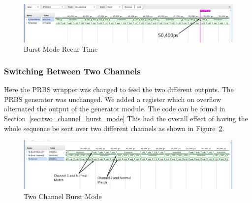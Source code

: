 \begin{figure}[ht]
    \centering
    \hspace*{-3cm}\includegraphics[width=1.4\linewidth]{img/burst_mode_3.png}
    \caption{Burst Mode Recur Time}%
    \label{fig:burst_mode_recur}
\end{figure}


\subsubsection{Switching Between Two Channels}%
\label{ssub:switching_between_two_channels}
Here the PRBS wrapper was changed to feed the two different outputs. The PRBS
generator was unchanged. We added a register which on overflow alternated the
output of the generator module. The code can be found in Section~\ref{sec:two_channel_burst_mode} 
This had the overall effect of having the whole sequence be sent over two
different channels as shown in Figure~\ref{fig:two_channel_tx}.


\begin{figure}[ht]
    \centering
    \hspace*{-3cm}\includegraphics[width=1.4\linewidth]{img/two_channel.png}
    \caption{Two Channel Burst Mode}%
    \label{fig:two_channel_tx}
\end{figure}

\cleardoublepage

